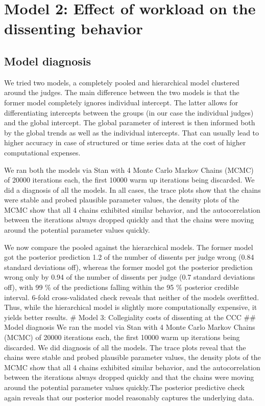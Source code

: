 \documentclass[
  11pt,
]{article}
\begin{document}
\hypertarget{model-2-effect-of-workload-on-the-dissenting-behavior}{%
\section{Model 2: Effect of workload on the dissenting
behavior}\label{model-2-effect-of-workload-on-the-dissenting-behavior}}

\hypertarget{model-diagnosis-1}{%
\subsection{Model diagnosis}\label{model-diagnosis-1}}

We tried two models, a completely pooled and hierarchical model
clustered around the judges. The main difference between the two models
is that the former model completely ignores individual intercept. The
latter allows for differentiating intercepts between the groups (in our
case the individual judges) and the global intercept. The global
parameter of interest is then informed both by the global trends as well
as the individual intercepts. That can usually lead to higher accuracy
in case of structured or time series data at the cost of higher
computational expenses.

We ran both the models via Stan with 4 Monte Carlo Markov Chains (MCMC)
of 20000 iterations each, the first 10000 warm up iterations being
discarded. We did a diagnosis of all the models. In all cases, the trace
plots show that the chains were stable and probed plausible parameter
values, the density plots of the MCMC show that all 4 chains exhibited
similar behavior, and the autocorrelation between the iterations always
dropped quickly and that the chains were moving around the potential
parameter values quickly.

We now compare the pooled against the hierarchical models. The former
model got the posterior prediction 1.2 of the number of dissents per
judge wrong (0.84 standard deviations off), whereas the former model got
the posterior prediction wrong only by 0.94 of the number of dissents
per judge (0.7 standard deviations off), with 99 \% of the predictions
falling within the 95 \% posterior credible interval. 6-fold
cross-validated check reveals that neither of the models overfitted.
Thus, while the hierarchical model is slightly more computationally
expensive, it yields better results. \# Model 3: Collegiality costs of
dissenting at the CCC \#\# Model diagnosis We ran the model via Stan
with 4 Monte Carlo Markov Chains (MCMC) of 20000 iterations each, the
first 10000 warm up iterations being discarded. We did diagnosis of all
the models. The trace plots reveal that the chains were stable and
probed plausible parameter values, the density plots of the MCMC show
that all 4 chains exhibited similar behavior, and the autocorrelation
between the iterations always dropped quickly and that the chains were
moving around the potential parameter values quickly.The posterior
predictive check again reveals that our posterior model reasonably
captures the underlying data.
\end{document}
